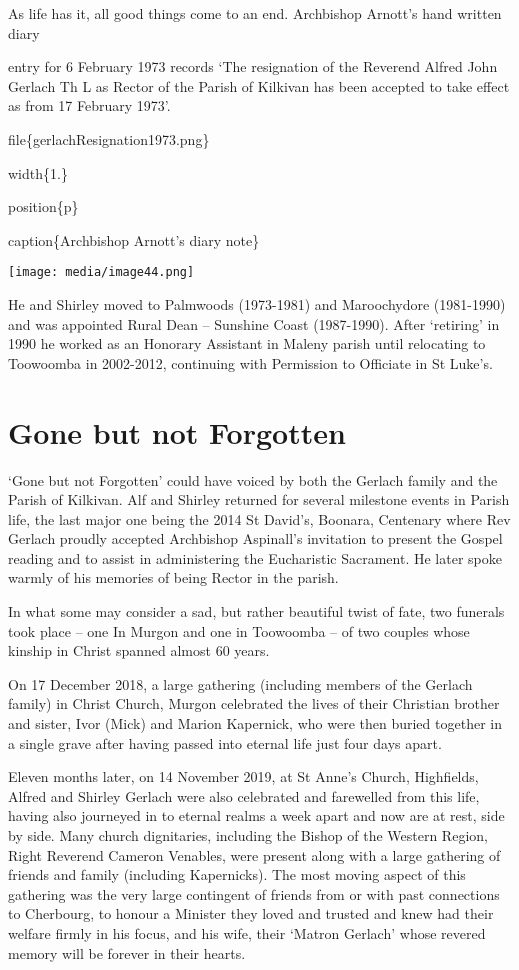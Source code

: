 As life has it, all good things come to an end. Archbishop Arnott's hand written diary

entry for 6 February 1973 records `The resignation of the Reverend Alfred John Gerlach Th L as Rector of the Parish of Kilkivan has been accepted to take effect as from 17 February 1973'.

file\{gerlachResignation1973.png\}

width\{1.\}

position\{p\}

caption\{Archbishop Arnott's diary note\}

\texttt{[image: media/image44.png]}

He and Shirley moved to Palmwoods (1973-1981) and Maroochydore (1981-1990) and was appointed Rural Dean -- Sunshine Coast (1987-1990). After `retiring' in 1990 he worked as an Honorary Assistant in Maleny parish until relocating to Toowoomba in 2002-2012, continuing with Permission to Officiate in St Luke's.

\hypertarget{gone-but-not-forgotten}{%
\section{Gone but not Forgotten}\label{gone-but-not-forgotten}}

`Gone but not Forgotten' could have voiced by both the Gerlach family and the Parish of Kilkivan. Alf and Shirley returned for several milestone events in Parish life, the last major one being the 2014 St David's, Boonara, Centenary where Rev Gerlach proudly accepted Archbishop Aspinall's invitation to present the Gospel reading and to assist in administering the Eucharistic Sacrament. He later spoke warmly of his memories of being Rector in the parish.

In what some may consider a sad, but rather beautiful twist of fate, two funerals took place -- one In Murgon and one in Toowoomba -- of two couples whose kinship in Christ spanned almost 60 years.

On 17 December 2018, a large gathering (including members of the Gerlach family) in Christ Church, Murgon celebrated the lives of their Christian brother and sister, Ivor (Mick) and Marion Kapernick, who were then buried together in a single grave after having passed into eternal life just four days apart.

Eleven months later, on 14 November 2019, at St Anne's Church, Highfields, Alfred and Shirley Gerlach were also celebrated and farewelled from this life, having also journeyed in to eternal realms a week apart and now are at rest, side by side. Many church dignitaries, including the Bishop of the Western Region, Right Reverend Cameron Venables, were present along with a large gathering of friends and family (including Kapernicks). The most moving aspect of this gathering was the very large contingent of friends from or with past connections to Cherbourg, to honour a Minister they loved and trusted and knew had their welfare firmly in his focus, and his wife, their `Matron Gerlach' whose revered memory will be forever in their hearts.

